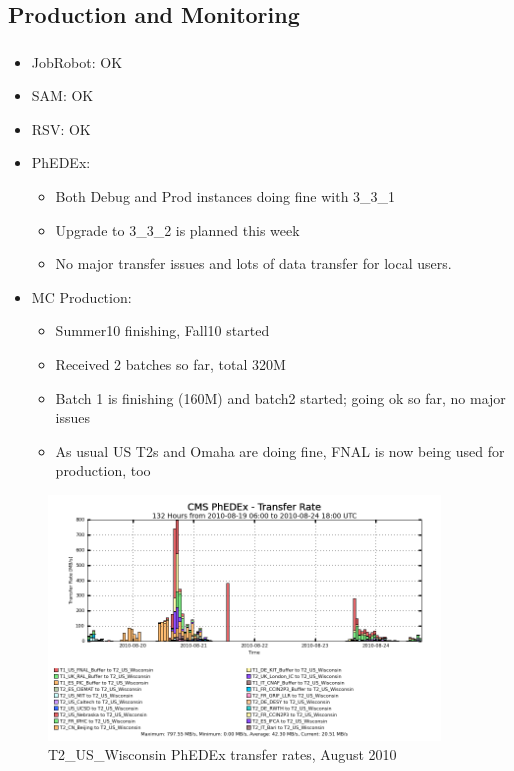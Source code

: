 \documentclass{beamer}
\begin{document}
\subsection{Production and Monitoring}
\begin{frame}
\frametitle{}

\begin{itemize}
    \item JobRobot: OK
    \item SAM: OK
    \item RSV: OK
    \item PhEDEx:
    \begin{itemize}
      \item Both Debug and Prod instances doing fine with 3\_3\_1
      \item Upgrade to 3\_3\_2 is planned this week
      \item No major transfer issues and lots of data transfer for local users.
    \end{itemize}
    \item MC Production:
    \begin{itemize}
      \item Summer10 finishing, Fall10 started
      \item Received 2 batches so far, total 320M
      \item Batch 1 is finishing (160M) and batch2 started; going ok so far, no major issues
      \item As usual US T2s and Omaha are doing fine, FNAL is now being used for production, too
    \end{itemize}
\end{itemize}
\end{frame}

\begin{frame}
  \begin{figure}
  \includegraphics[height=6.5cm]{Graphics/phedex-rate-Aug2010.png}
  \caption{T2\_US\_Wisconsin PhEDEx transfer rates, August 2010}
  \end{figure}
\end{frame}
\end{document}
